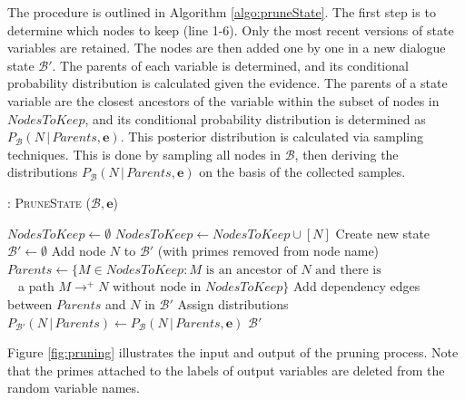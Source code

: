 The procedure is outlined in Algorithm \ref{algo:pruneState}. The first step is to determine which nodes to keep (line 1-6).  Only the most recent versions of state variables are retained. 
The nodes are then added one by one in a new dialogue state $\mathcal{B}'$.  The parents of each variable is determined, and its conditional probability distribution is calculated given the evidence.  The parents of a state variable are the closest ancestors of the variable within the subset of nodes in $\mathit{NodesToKeep}$, and its conditional probability distribution is determined as $P_{\mathcal{B}}(N \, | \, \mathit{Parents}, \mathbf{e})$.  This posterior distribution is calculated via sampling techniques. This is done by sampling all nodes in $\mathcal{B}$, then deriving the distributions $P_{\mathcal{B}}(N \, | \, \mathit{Parents}, \mathbf{e})$ on the basis of the collected samples. 

\begin{algorithm}[h]
\caption{: \textsc{PruneState} ($\mathcal{B}, \mathbf{e}$)}
\begin{algorithmic}[1] \vspace{1mm}
\STATE $\mathit{NodesToKeep} \leftarrow \emptyset$
\STATE $\mathit{NodesToKeep} \leftarrow \mathit{NodesToKeep} \cup [N]$ 
\ENDIF
\ENDFOR
\STATE Create new state $\mathcal{B}' \leftarrow \emptyset$
\STATE Add node $N$ to $\mathcal{B}'$ (with primes removed from node name)
\STATE $\mathit{Parents} \leftarrow \{M \in \mathit{NodesToKeep} : M \text{ is an ancestor of } N \text{ and there is } $ \\ $\phantom{a}$  \; \; \; \; \; \; \; \; \;  a path $M \rightarrow^+  N \text{ without node in } \mathit{NodesToKeep} \}$ 
\STATE Add dependency edges between $\mathit{Parents}$ and $N$ in $\mathcal{B}'$
\STATE Assign distributions $P_{\mathcal{B}'}(N \, | \, \mathit{Parents}) \leftarrow P_{\mathcal{B}}(N \, | \, \mathit{Parents}, \mathbf{e})$
\ENDFOR
\RETURN $\mathcal{B}'$
\end{algorithmic}
\label{algo:pruneState}
\end{algorithm}


Figure \ref{fig:pruning} illustrates the input and output of the pruning process.  Note that the primes attached to the labels of output variables are deleted from the random variable names.


